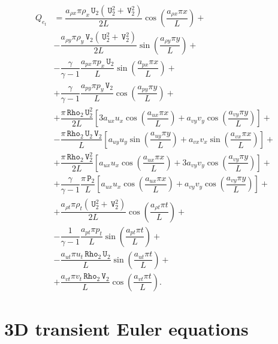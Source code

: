 \documentclass[10pt]{article}
\newcommand{\Rho}{\,\mathtt{Rho}}
\newcommand{\PP}{\,\mathtt{P}}
\newcommand{\U}{\,\mathtt{U}}
\newcommand{\V}{\,\mathtt{V}}
\begin{document}
\begin{equation}
 \begin{split}\label{eq:source_e_2d}
Q_{e_t} &=\dfrac{ a_{\rho x} \pi \rho_x  \U_2 (\U_2^2+\V_2^2)}{2L}\cos\left(\dfrac{a_{\rho x} \pi x}{L}\right)+\\
&-\dfrac{ a_{\rho y} \pi \rho_y \V_2 (\U_2^2+\V_2^2) }{2L}\sin\left(\dfrac{a_{\rho y} \pi y}{L}\right) +\\
&-\dfrac{\gamma}{\gamma-1}\dfrac{a_{px} \pi p_x  \U_2}{L}\sin\left(\dfrac{a_{px} \pi x}{L}\right) +\\
&+  \dfrac{\gamma}{\gamma-1}\dfrac{a_{py}\pi p_y  \V_2}{L}\cos\left(\dfrac{a_{py} \pi y}{L}\right)+\\
&+ \dfrac{ \pi \Rho_2 \U_2^2}{2L}\left[3 a_{ux} u_x \cos\left(\dfrac{a_{ux} \pi x}{L}\right)+a_{vy} v_y \cos\left(\dfrac{a_{vy} \pi y}{L}\right)\right]+\\
&-\dfrac{\pi \Rho_2 \U_2 \V_2}{L}\left[a_{uy} u_y \sin\left(\dfrac{a_{uy} \pi y}{L}\right)+a_{vx}  v_x\sin\left(\dfrac{a_{vx} \pi x}{L}\right)\right] +\\
&+\dfrac{\pi \Rho_2 \V_2^2}{2L} \left[a_{ux} u_x \cos\left(\dfrac{a_{ux} \pi x}{L}\right)+3 a_{vy} v_y \cos\left(\dfrac{a_{vy} \pi y}{L}\right)\right] +\\
&+ \dfrac{\gamma}{\gamma-1}\dfrac{\pi \PP_2}{L}\left[a_{ux} u_x \cos\left(\dfrac{a_{ux} \pi x}{L}\right)+a_{vy} v_y \cos\left(\dfrac{a_{vy} \pi y}{L}\right)\right]+\\
&+\dfrac{  a_{\rho t} \pi \rho_t (\U_2^2+\V_2^2)}{2L}\cos\left(\dfrac{a_{\rho t} \pi t}{L}\right)+\\
&-\dfrac{1}{\gamma-1}\dfrac{a_{pt} \pi p_t }{L}\sin\left(\dfrac{a_{pt} \pi t}{L}\right) +\\
&-\dfrac{a_{ut} \pi u_t \Rho_2 \U_2 }{L}\sin\left(\dfrac{a_{ut} \pi t}{L}\right)+\\
&+\dfrac{a_{vt} \pi v_t \Rho_2 \V_2 }{L}\cos\left(\dfrac{a_{vt} \pi t}{L}\right).
 \end{split}
\end{equation}



\section{3D transient Euler equations}
\end{document}
